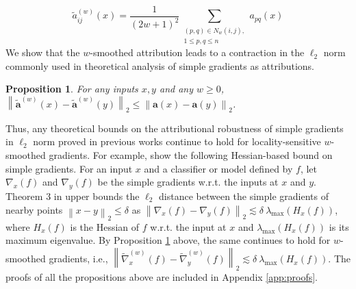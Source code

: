 \documentclass[letterpaper]{article} %
\newtheorem{prop}{Proposition}
\def\ba{\mathbf{a}}
\newcommand{\norm}[1]{\left\|#1\right\|}
\begin{document}
\[
\tilde{a}_{ij}^{(w)}(x) = \frac{1}{(2w+1)^{2}} \sum_{\substack{(p, q) \in N_{w}(i, j), \\ 1 \leq p, q \leq n}} a_{pq}(x)
\]
We show that the $w$-smoothed attribution leads to a contraction in the $\ell_{2}$ norm commonly used in theoretical analysis of simple gradients as attributions.
\begin{prop} \label{prop:w-smoothed}
For any inputs $x, y$ and any $w \geq 0$, $\norm{\tilde{\ba}^{(w)}(x) - \tilde{\ba}^{(w)}(y)}_{2} \leq \norm{\ba(x) - \ba(y)}_{2}$.
\end{prop}
Thus, any theoretical bounds on the attributional robustness of simple gradients in $\ell_{2}$ norm proved in previous works continue to hold for locality-sensitive $w$-smoothed gradients. For example, \cite{wang2020smoothed} show the following Hessian-based bound on simple gradients. For an input $x$ and a classifier or model defined by $f$, let $\nabla_{x}(f)$ and $\nabla_{y}(f)$ be the simple gradients w.r.t. the inputs at $x$ and $y$. Theorem 3 in \cite{wang2020smoothed} upper bounds the $\ell_{2}$ distance between the simple gradients of nearby points $\norm{x - y}_{2} \leq \delta$ as  $\norm{\nabla_{x}(f) - \nabla_{y}(f)}_{2} \lesssim \delta~ \lambda_{\text{max}}(H_{x}(f))$, where $H_{x}(f)$ is the Hessian of $f$ w.r.t. the input at $x$ and $\lambda_{\text{max}}(H_{x}(f))$ is its maximum eigenvalue. By Proposition \ref{prop:w-smoothed} above, the same continues to hold for $w$-smoothed gradients, i.e., $\norm{\tilde{\nabla}_{x}^{(w)}(f) - \tilde{\nabla}_{y}^{(w)}(f)}_{2} \lesssim \delta~ \lambda_{\text{max}}(H_{x}(f))$. The proofs of all the propositions above are included in Appendix \ref{app:proofs}.
\end{document}
